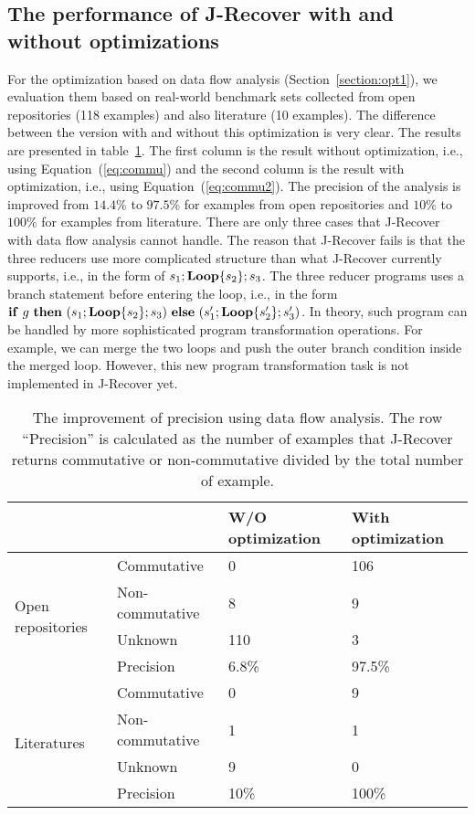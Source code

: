 \documentclass{llncs}
\newcommand{\ite}[3]{
	 \ifmmode 
	 \mathbf{if}\ #1 \ \mathbf{then}\ #2\  \mathbf{else}\ #3 
	 \else
	 \textbf{if}\ #1 \ \textbf{then}\ #2\  \textbf{else}\ #3
	 \fi}
\newcommand{\rloop}{
	\ifmmode 
	\mathbf{Loop}
	\else
	\textbf{Loop}
	\fi}
\begin{document}
\subsection{The performance of J-Recover with and without optimizations}


For the optimization based on data flow analysis (Section~\ref{section:opt1}), we evaluation them based on real-world benchmark sets collected from open repositories (118 examples) and also literature (10 examples). The difference between the version with and without this optimization is very clear. The results are presented in table~\ref{tab:opt1}. The first column is the result without optimization, i.e., using Equation~(\ref{eq:commu}) and the second column is the result with optimization, i.e., using Equation~(\ref{eq:commu2}). The precision of the analysis is improved from $14.4\%$ to $97.5\%$ for examples from open repositories and
$10\%$ to $100\%$ for examples from literature. There are only three cases that J-Recover with data flow analysis cannot handle. The reason that J-Recover fails is that the three reducers use more complicated structure than what J-Recover currently supports, i.e., in the form of $s_1;\rloop\{s_2\};s_3$. The three reducer programs uses a branch statement before entering the loop, i.e., in the form $\ite{g}{(s_1;\rloop\{s_2\};s_3)}{(s'_1;\rloop\{s'_2\};s'_3)}$. In theory, such program can be handled by more sophisticated program transformation operations. For example, we can merge the two loops and push the outer branch condition inside the merged loop. 
However, this new program transformation task is not implemented in J-Recover yet.

\begin{table}[htb]
	\centering
	\begin{tabular}{|l|l|l|l|}
		\hline
		& &W/O optimization	& With optimization\\
		\hline
		\hline
		\multirow{4}{*}{Open repositories}&Commutative& 0&106\\ 
		\cline{2-4}
		&Non-commutative&8&9\\
		\cline{2-4}
		&Unknown&110&3\\
		\cline{2-4}
		&Precision& 6.8\% & 97.5\%\\
		\hline
		\hline
		\multirow{4}{*}{Literatures}&Commutative& 0&9\\
		\cline{2-4}
		&Non-commutative&1&1\\
		\cline{2-4}
		&Unknown&9&0\\
		\cline{2-4}
		&Precision& 10\% & 100\%\\
		\hline
	\end{tabular}
	\caption{The improvement of precision using data flow analysis. The row ``Precision'' is calculated as the number of examples that J-Recover returns commutative or non-commutative divided by the total number of example.}
	\label{tab:opt1}
\end{table}
\end{document}
